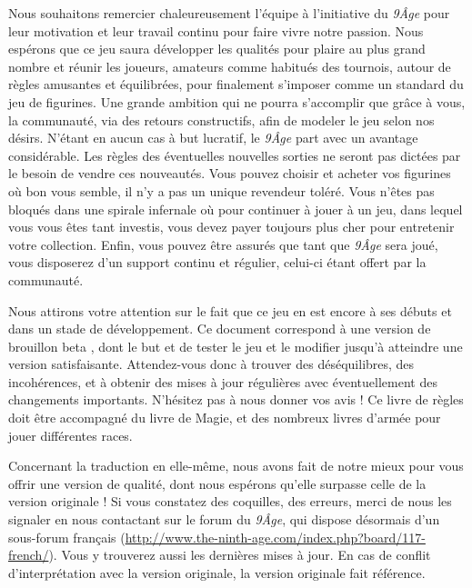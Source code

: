 \begin{titlepage}
\newpage

\thispagestyle{empty}

{\fontsize{12}{14.4}\selectfont
{}
\vspace{0.5cm}

Nous souhaitons remercier chaleureusement l'équipe à l'initiative du \emph{9\ieme Âge} pour leur motivation et leur travail continu pour faire vivre notre passion. Nous espérons que ce jeu saura développer les qualités pour plaire au plus grand nombre et réunir les joueurs, amateurs comme habitués des tournois, autour de règles amusantes et équilibrées, pour finalement s'imposer comme un standard du jeu de figurines. Une grande ambition qui ne pourra s'accomplir que grâce à vous, la communauté, via des retours constructifs, afin de modeler le jeu selon nos désirs. N'étant en aucun cas à but lucratif, le \emph{9\ieme Âge} part avec un avantage considérable. Les règles des éventuelles nouvelles sorties ne seront pas dictées par le besoin de vendre ces nouveautés. Vous pouvez choisir et acheter vos figurines où bon vous semble, il n'y a pas un unique revendeur toléré. Vous n'êtes pas bloqués dans une spirale infernale où pour continuer à jouer à un jeu, dans lequel vous vous êtes tant investis, vous devez payer toujours plus cher pour entretenir votre collection. Enfin, vous pouvez être assurés que tant que \emph{9\ieme Âge} sera joué, vous disposerez d'un support continu et régulier, celui-ci étant offert par la communauté.

Nous attirons votre attention sur le fait que ce jeu en est encore à ses débuts et dans un stade de développement. Ce document correspond à une version de brouillon \og beta \fg , dont le but et de tester le jeu et le modifier jusqu'à atteindre une version satisfaisante. Attendez-vous donc à trouver des déséquilibres, des incohérences, et à obtenir des mises à jour régulières avec éventuellement des changements importants. N'hésitez pas à nous donner vos avis ! Ce livre de règles doit être accompagné du livre de Magie, et des nombreux livres d'armée pour jouer différentes races.

Concernant la traduction en elle-même, nous avons fait de notre mieux pour vous offrir une version de qualité, dont nous espérons qu'elle surpasse celle de la version originale ! Si vous constatez des coquilles, des erreurs, merci de nous les signaler en nous contactant sur le forum du \emph{9\ieme Âge}, qui dispose désormais d'un sous-forum français (\url{http://www.the-ninth-age.com/index.php?board/117-french/}). Vous y trouverez aussi les dernières mises à jour. En cas de conflit d'interprétation avec la version originale, la version originale fait référence.

}
\end{titlepage}
